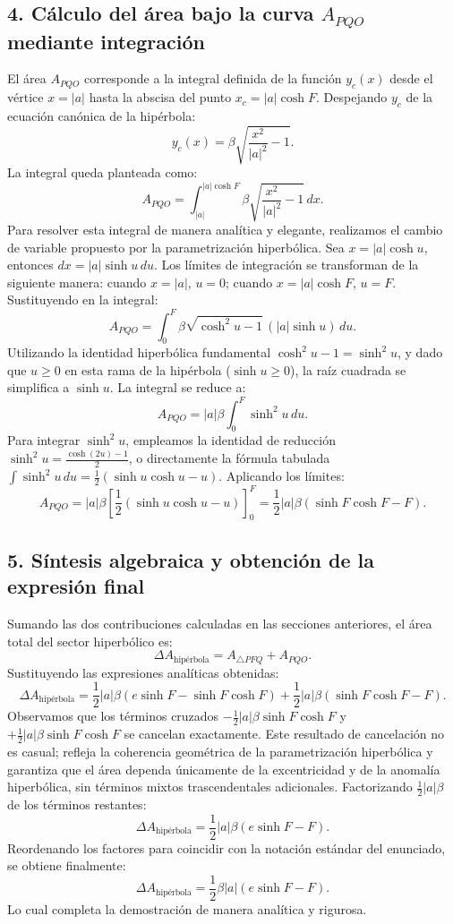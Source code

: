 \documentclass[12pt, a4paper]{article}
\begin{document}
\subsection*{4. Cálculo del área bajo la curva $A_{PQO}$ mediante integración}
El área $A_{PQO}$ corresponde a la integral definida de la función $y_c(x)$ desde el vértice $x = |a|$ hasta la abscisa del punto $x_c = |a|\cosh F$. Despejando $y_c$ de la ecuación canónica de la hipérbola:
$$
y_c(x) = \beta \sqrt{\frac{x^2}{|a|^2} - 1}.
$$
La integral queda planteada como:
$$
A_{PQO} = \int_{|a|}^{|a|\cosh F} \beta \sqrt{\frac{x^2}{|a|^2} - 1} \, dx.
$$
Para resolver esta integral de manera analítica y elegante, realizamos el cambio de variable propuesto por la parametrización hiperbólica. Sea $x = |a|\cosh u$, entonces $dx = |a|\sinh u \, du$. Los límites de integración se transforman de la siguiente manera: cuando $x = |a|$, $u = 0$; cuando $x = |a|\cosh F$, $u = F$. Sustituyendo en la integral:
$$
A_{PQO} = \int_{0}^{F} \beta \sqrt{\cosh^2 u - 1} \, (|a|\sinh u) \, du.
$$
Utilizando la identidad hiperbólica fundamental $\cosh^2 u - 1 = \sinh^2 u$, y dado que $u \geq 0$ en esta rama de la hipérbola ($\sinh u \geq 0$), la raíz cuadrada se simplifica a $\sinh u$. La integral se reduce a:
$$
A_{PQO} = |a|\beta \int_{0}^{F} \sinh^2 u \, du.
$$
Para integrar $\sinh^2 u$, empleamos la identidad de reducción $\sinh^2 u = \frac{\cosh(2u) - 1}{2}$, o directamente la fórmula tabulada $\int \sinh^2 u \, du = \frac{1}{2}(\sinh u \cosh u - u)$. Aplicando los límites:
$$
A_{PQO} = |a|\beta \left[ \frac{1}{2}(\sinh u \cosh u - u) \right]_{0}^{F} = \frac{1}{2} |a|\beta \left( \sinh F \cosh F - F \right).
$$

\subsection*{5. Síntesis algebraica y obtención de la expresión final}
Sumando las dos contribuciones calculadas en las secciones anteriores, el área total del sector hiperbólico es:
$$
\Delta A_{\text{hipérbola}} = A_{\triangle PFQ} + A_{PQO}.
$$
Sustituyendo las expresiones analíticas obtenidas:
$$
\Delta A_{\text{hipérbola}} = \frac{1}{2} |a|\beta \left( e\sinh F - \sinh F \cosh F \right) + \frac{1}{2} |a|\beta \left( \sinh F \cosh F - F \right).
$$
Observamos que los términos cruzados $-\frac{1}{2}|a|\beta\sinh F\cosh F$ y $+\frac{1}{2}|a|\beta\sinh F\cosh F$ se cancelan exactamente. Este resultado de cancelación no es casual; refleja la coherencia geométrica de la parametrización hiperbólica y garantiza que el área dependa únicamente de la excentricidad y de la anomalía hiperbólica, sin términos mixtos trascendentales adicionales.
Factorizando $\frac{1}{2}|a|\beta$ de los términos restantes:
$$
\Delta A_{\text{hipérbola}} = \frac{1}{2} |a|\beta \left( e\sinh F - F \right).
$$
Reordenando los factores para coincidir con la notación estándar del enunciado, se obtiene finalmente:
$$
\Delta A_{\text{hipérbola}} = \frac{1}{2} \beta |a| (e \sinh F - F).
$$
Lo cual completa la demostración de manera analítica y rigurosa.
\end{document}
